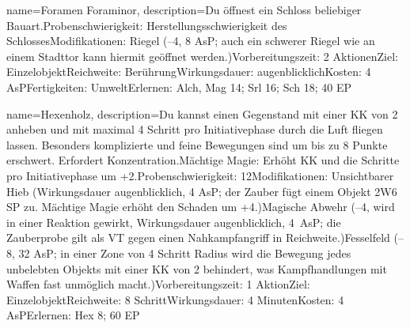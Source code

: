 {
    name={Foramen Foraminor},
    description={Du öffnest ein Schloss beliebiger Bauart.\newline Probenschwierigkeit: Herstellungsschwierigkeit des Schlosses\newline Modifikationen: Riegel (–4, 8 AsP; auch ein schwerer Riegel wie an einem Stadttor kann hiermit geöffnet werden.)\newline Vorbereitungszeit: 2 Aktionen\newline Ziel: Einzelobjekt\newline Reichweite: Berührung\newline Wirkungsdauer: augenblicklich\newline Kosten: 4 AsP\newline Fertigkeiten: Umwelt\newline Erlernen: Alch, Mag 14; Srl 16; Sch 18; 40 EP}
}


{
    name={Hexenholz},
    description={Du kannst einen Gegenstand mit einer KK von 2 anheben und mit maximal 4 Schritt pro Initiativephase durch die Luft fliegen lassen. Besonders komplizierte und feine Bewegungen sind um bis zu 8 Punkte erschwert. Erfordert Konzentration.\newline Mächtige Magie: Erhöht KK und die Schritte pro Initiativephase um +2.\newline Probenschwierigkeit: 12\newline Modifikationen: Unsichtbarer Hieb (Wirkungsdauer augenblicklich, 4 AsP; der Zauber fügt einem Objekt 2W6 SP zu. Mächtige Magie erhöht den Schaden um +4.)\newline Magische Abwehr (–4, wird in einer Reaktion gewirkt, Wirkungsdauer augenblicklich, 4 AsP; die Zauberprobe gilt als VT gegen einen Nahkampfangriff in Reichweite.)\newline Fesselfeld (–8, 32 AsP; in einer Zone von 4 Schritt Radius wird die Bewegung jedes unbelebten Objekts mit einer KK von 2 behindert, was Kampfhandlungen mit Waffen fast unmöglich macht.)\newline Vorbereitungszeit: 1 Aktion\newline Ziel: Einzelobjekt\newline Reichweite: 8 Schritt\newline Wirkungsdauer: 4 Minuten\newline Kosten: 4 AsP\newline Erlernen: Hex 8; 60 EP}
}


